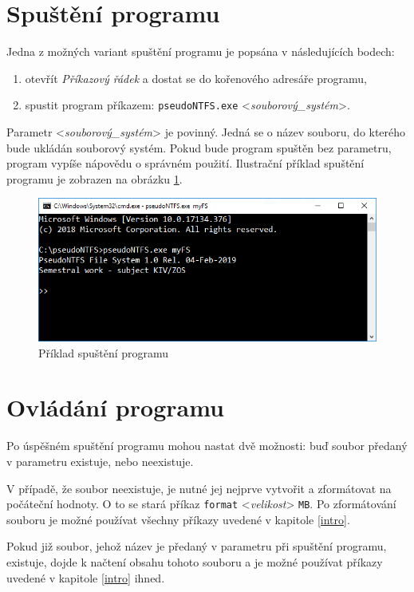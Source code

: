 \documentclass[
11pt,
a4paper,
pdftex,
czech,
titlepage
]{report}
\begin{document}
\section{Spuštění programu}
Jedna z možných variant spuštění programu je popsána v následujících bodech:

\begin{enumerate}
\item otevřít \textit{Příkazový řádek} a dostat se do kořenového adresáře programu,
\item spustit program příkazem: \texttt{pseudoNTFS.exe} <\textit{souborový\_systém}>.\\
\end{enumerate}

\noindent Parametr <\textit{souborový\_systém}> je povinný. Jedná se o název souboru, do kterého bude ukládán souborový systém. Pokud bude program spuštěn bez parametru, program vypíše nápovědu o správném použití. Ilustrační příklad spuštění programu je zobrazen na obrázku \ref{start_prog}.

\begin{figure}[!ht]
	\centering
	\includegraphics[width=1\textwidth]{img/start_prog.png}
	\caption{Příklad spuštění programu}
	\label{start_prog}
\end{figure}

\section{Ovládání programu}
Po úspěšném spuštění programu mohou nastat dvě možnosti: buď soubor předaný v parametru existuje, nebo neexistuje. 

V případě, že soubor neexistuje, je nutné jej nejprve vytvořit a zformátovat na počáteční hodnoty. O to se stará příkaz \texttt{format} <\textit{velikost}> \texttt{MB}. Po zformátování souboru je možné používat všechny příkazy uvedené v kapitole \ref{intro}.

Pokud již soubor, jehož název je předaný v parametru při spuštění programu, existuje, dojde k načtení obsahu tohoto souboru a je možné používat příkazy uvedené v kapitole \ref{intro} ihned.
\end{document}
